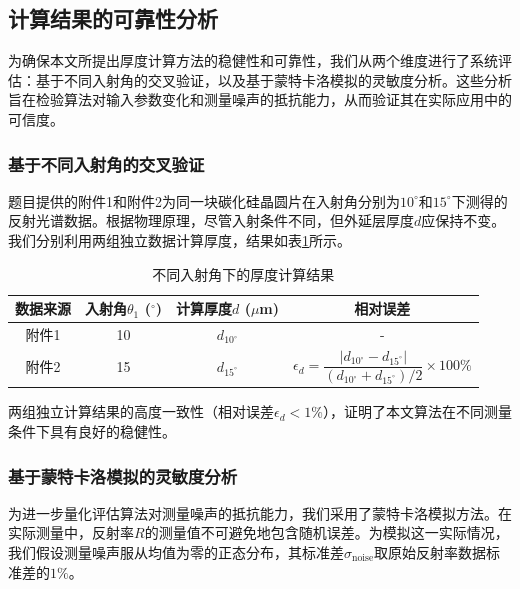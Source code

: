 \documentclass[withoutpreface,bwprint]{cumcmthesis} %
\begin{document}
\subsection{计算结果的可靠性分析}

为确保本文所提出厚度计算方法的稳健性和可靠性，我们从两个维度进行了系统评估：基于不同入射角的交叉验证，以及基于蒙特卡洛模拟的灵敏度分析。这些分析旨在检验算法对输入参数变化和测量噪声的抵抗能力，从而验证其在实际应用中的可信度。

\subsubsection{基于不同入射角的交叉验证}

题目提供的附件1和附件2为同一块碳化硅晶圆片在入射角分别为$10^\circ$和$15^\circ$下测得的反射光谱数据。根据物理原理，尽管入射条件不同，但外延层厚度$d$应保持不变。我们分别利用两组独立数据计算厚度，结果如表\ref{tab:cross-validation}所示。

\begin{table}[htbp]
    \centering
    \caption{不同入射角下的厚度计算结果}
    \label{tab:cross-validation}
    \begin{tabular}{cccc}
        \toprule
        数据来源 & 入射角$\theta_1$ ($^\circ$) & 计算厚度$d$ ($\mu$m) & 相对误差                                                                                               \\
        \midrule
        附件1  & 10                       & $d_{10^\circ}$   & -                                                                                                  \\
        附件2  & 15                       & $d_{15^\circ}$   & $\epsilon_d = \dfrac{|d_{10^\circ} - d_{15^\circ}|}{(d_{10^\circ} + d_{15^\circ})/2} \times 100\%$ \\
        \bottomrule
    \end{tabular}
\end{table}

两组独立计算结果的高度一致性（相对误差$\epsilon_d < 1\%$），证明了本文算法在不同测量条件下具有良好的稳健性。

\subsubsection{基于蒙特卡洛模拟的灵敏度分析}

为进一步量化评估算法对测量噪声的抵抗能力，我们采用了蒙特卡洛模拟方法。在实际测量中，反射率$R$的测量值不可避免地包含随机误差。为模拟这一实际情况，我们假设测量噪声服从均值为零的正态分布，其标准差$\sigma_{\text{noise}}$取原始反射率数据标准差的$1\%$。
\end{document}
